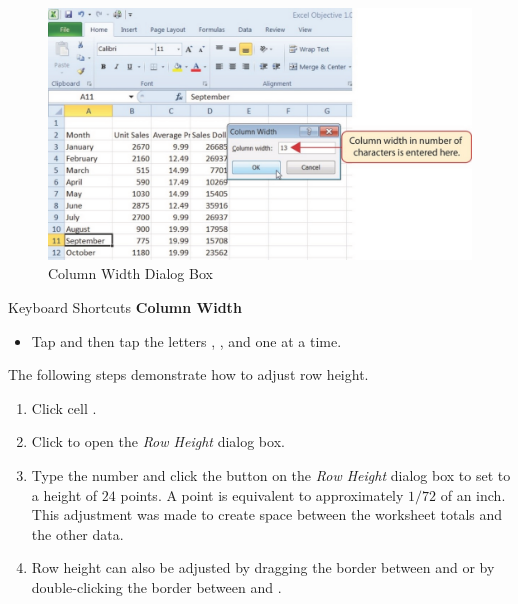 \begin{figure}[H]
	\centering
	\includegraphics[width=\maxwidth{.95\linewidth}]{gfx/ch01_fig24}
	\caption{Column Width Dialog Box}
	\label{01:fig24}
\end{figure}

\begin{center}
	\begin{shtcutbox}{Keyboard Shortcuts}
		\textbf{Column Width}
		\\
		\begin{itemize}
			\setlength{\itemsep}{0pt}
			\setlength{\parskip}{0pt}
			\setlength{\parsep}{0pt}
			
			\item Tap  and then tap the letters , , and  one at a time.
			
		\end{itemize}
	\end{shtcutbox}
\end{center}

The following steps demonstrate how to adjust row height.

\begin{enumbox}
	\begin{enumerate}
		\item Click cell .
		\item Click  to open the \textit{Row Height} dialog box.
		\item Type the number  and click the  button on the \textit{Row Height} dialog box to set  to a height of $ 24 $ points. A point is equivalent to approximately $ 1/72 $ of an inch. This adjustment was made to create space between the worksheet totals and the other data.
		\item Row height can also be adjusted by dragging the border between  and  or by double-clicking the border between  and .
	\end{enumerate}
\end{enumbox}

